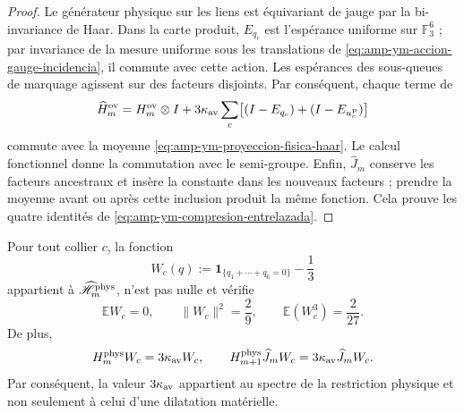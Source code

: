 \begin{proof}
Le générateur physique sur les liens est équivariant de jauge par la
bi-invariance de Haar. Dans la carte produit, \(E_{q_c}\) est l’espérance
uniforme sur \(\mathbb F_3^6\) ; par invariance de la mesure uniforme sous
les translations de \eqref{eq:amp-ym-accion-gauge-incidencia}, il commute avec
cette action. Les espérances des sous-queues de marquage agissent sur des
facteurs disjoints. Par conséquent, chaque terme de
\[
 \widehat H_m^{\rm ov}
 =H_m^{\rm ov}\otimes I
 +3\kappa_{\rm av}\sum_c
 \bigl[(I-E_{q_c})+(I-E_{u_c^{\rm P}})\bigr]
\]
commute avec la moyenne \eqref{eq:amp-ym-proyeccion-fisica-haar}. Le calcul fonctionnel donne la commutation avec le semi-groupe. Enfin, \(\widehat J_m\) conserve les facteurs ancestraux et insère la constante dans les nouveaux facteurs ; prendre la moyenne avant ou après cette inclusion produit la même fonction. Cela prouve les quatre identités de \eqref{eq:amp-ym-compresion-entrelazada}.
\end{proof}

\begin{lemma}
\label{lem:amp-ym-testigo-fisico-q6}
Pour tout collier \(c\), la fonction
\begin{equation}\label{eq:amp-ym-testigo-fisico-def}
 W_c(q)
 :=\mathbf 1_{\{q_1+\cdots+q_6=0\}}-\frac13
\end{equation}
appartient à \(\widehat{\mathscr H}_m^{\rm phys}\), n’est pas nulle et vérifie
\begin{equation}\label{eq:amp-ym-testigo-fisico-momentos}
 \mathbb E W_c=0,\qquad
 \|W_c\|^2=\frac29,\qquad
 \mathbb E(W_c^3)=\frac2{27}.
\end{equation}
De plus,
\begin{equation}\label{eq:amp-ym-testigo-fisico-gap}
 H_m^{\rm phys}W_c=3\kappa_{\rm av}W_c,\qquad
 H_{m+1}^{\rm phys}\widehat J_mW_c
 =3\kappa_{\rm av}\widehat J_mW_c.
\end{equation}
Par conséquent, la valeur \(3\kappa_{\rm av}\) appartient au spectre de la
restriction physique et non seulement à celui d’une dilatation matérielle.
\end{lemma}

